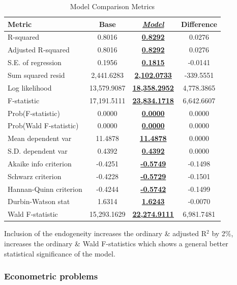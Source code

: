 \documentclass[]{article}
\begin{document}
\begin{table}[htbp]
	\centering
	\caption{Model Comparison Metrics}
	\begin{tabular}{lccc}
		\hline
		\textbf{Metric} & \textbf{Base} & \textbf{\underline{\textit{\textbf{Model}}}} & \textbf{Difference} \\
		\hline
		R-squared & 0.8016 & \underline{\textbf{0.8292}} & 0.0276 \\
		Adjusted R-squared & 0.8016 & \underline{\textbf{0.8292}} & 0.0276 \\
		S.E. of regression & 0.1956 & \underline{\textbf{0.1815}} & -0.0141 \\
		Sum squared resid & 2,441.6283 & \underline{\textbf{2,102.0733}} & -339.5551 \\
		Log likelihood & 13,579.9087 & \underline{\textbf{18,358.2952}} & 4,778.3865 \\
		F-statistic & 17,191.5111 & \underline{\textbf{23,834.1718}} & 6,642.6607 \\
		Prob(F-statistic) & 0.0000 & \underline{\textbf{0.0000}} & 0.0000 \\
		Prob(Wald F-statistic) & 0.0000 & \underline{\textbf{0.0000}} & 0.0000 \\
		Mean dependent var & 11.4878 & \underline{\textbf{11.4878}} & 0.0000 \\
		S.D. dependent var & 0.4392 & \underline{\textbf{0.4392}} & 0.0000 \\
		Akaike info criterion & -0.4251 & \underline{\textbf{-0.5749}} & -0.1498 \\
		Schwarz criterion & -0.4228 & \underline{\textbf{-0.5729}} & -0.1501 \\
		Hannan-Quinn criterion & -0.4244 & \underline{\textbf{-0.5742}} & -0.1499 \\
		Durbin-Watson stat & 1.6314 & \underline{\textbf{1.6243}} & -0.0070 \\
		Wald F-statistic & 15,293.1629 & \underline{\textbf{22,274.9111}} & 6,981.7481 \\
		\hline
	\end{tabular}
\end{table}

Inclusion of the endogeneity increases the ordinary \& adjusted R$^2$ by 2\%, increases the ordinary \& Wald F-statistics which shows a general better statistical significance of the model.

\subsubsection{Econometric problems}
\end{document}
